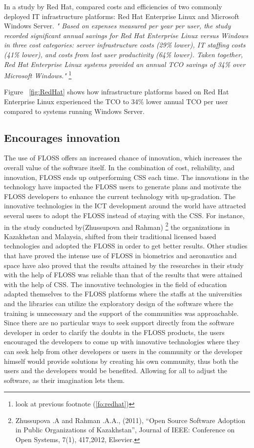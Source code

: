  In a study by Red Hat, compared costs and efficiencies of two commonly deployed IT infrastructure platforms: Red Hat Enterprise Linux and Microsoft Windows Server.\textit{ " Based on expenses measured per year per user, the study recorded significant annual savings for Red Hat Enterprise Linux versus Windows in three cost categories: server infrastructure costs (29\% lower), IT staffing costs (41\% lower), and costs from lost user productivity (64\% lower). Taken together, Red Hat Enterprise Linux systems provided an annual TCO savings of 34\% over Microsoft Windows."}
   \footnote{look at previous footnote  (\ref{fo:redhat})}

 
Figure ~\ref{fig:RedHat} shows how infrastructure platforms based on Red Hat Enterprise Linux experienced the TCO  to 34\% lower annual TCO per user compared to systems running Windows Server.

 \subsection{Encourages innovation}
  The use of FLOSS offers an increased chance of innovation, which increases the overall value of the software itself. In the combination of cost, reliability, and innovation, FLOSS ends up outperforming CSS  each time.
  The innovations in the technology have impacted the FLOSS users to generate plans and motivate the FLOSS developers to enhance the current technology with up-gradation. The innovative technologies in the ICT development around the world have attracted several users to adopt the FLOSS instead of staying with the CSS. For instance, in the study conducted by(Zhussupova and Rahman) \footnote{Zhussupova .A and Rahman .A.A., (2011), “Open Source Software Adoption in Public Organizations of Kazakhstan”, Journal of IEEE: Conference on Open Systems, 7(1), 417,2012, Elsevier.} the organizations in Kazakhstan and Malaysia, shifted from their traditional licensed based technologies and adopted the FLOSS in order to get better results. Other studies that have proved the intense use of FLOSS in biometrics and aeronautics and space have also proved that the results attained by the researches in their study with the help of FLOSS was reliable than that of the results that were attained with the help of CSS. The innovative technologies in the field of education adapted themselves to the FLOSS platforms where the staffs at the universities and the libraries can utilize the exploratory design of the software where the training is unnecessary and the support of the communities was approachable. Since there are no particular ways to seek support directly from the software developer in order to clarify the doubts in the FLOSS products, the users encouraged the developers to come up with innovative technologies where they can seek help from other developers or users in the community or the developer himself would provide solutions by creating his own community, thus both the users and the developers would be benefited. Allowing for all to adjust the software, as their imagination lets them.  
  
